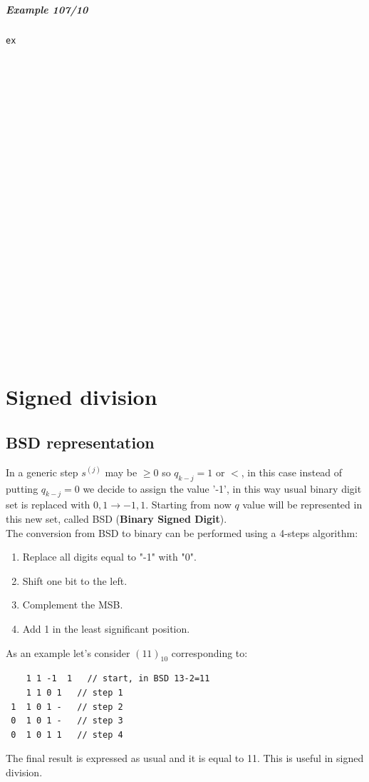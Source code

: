 \subparagraph{Example 107/10}

\begin{verbatim}
ex























\end{verbatim}

\section{Signed division}

\subsection{BSD representation}
In a generic step $s^{(j)}$ may be $\geq 0$ so  $q_{k-j}=1$ or $<$, in this case instead of putting $q_{k-j}=0$ we decide to assign the value '-1', in this way usual binary digit set is replaced with ${0,1} \rightarrow {-1, 1}$. Starting from now $q$ value will be represented in this new set, called BSD (\textbf{Binary Signed Digit}).\\

The conversion from BSD to binary can be performed using a 4-steps algorithm:
\begin{enumerate}
  \item Replace all digits equal to "-1" with "0".
  \item Shift one bit to the left.
  \item Complement the MSB.
  \item Add 1 in the least significant position.
\end{enumerate}

As an example let's consider $(11)_{10}$ corresponding to:
\begin{verbatim}
    1 1 -1  1   // start, in BSD 13-2=11
    1 1 0 1   // step 1
 1  1 0 1 -   // step 2
 0  1 0 1 -   // step 3
 0  1 0 1 1   // step 4
\end{verbatim}

The final result is expressed as usual and it is equal to 11. This is useful in signed division.

